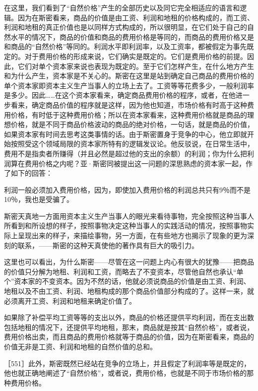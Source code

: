 在这里，我们看到了“自然价格”产生的全部历史以及同它完全相适应的语言和逻辑。因为在斯密看来，商品的价值是由工资、利润和地租的价格构成的，而工资、利润和地租的真正价值也是以同样方式构成的，所以很明显，在它们处于自己的自然水平的情况下，商品的价值和商品的费用价格是等同的，而商品的费用价格又是和商品的“自然价格”等同的。利润水平即利润率，以及工资率，都被假定为事先既定的。对于费用价格的形成来说，它们确实是既定的。它们是费用价格的前提。因此，它们对单个资本家来说也表现为既定的。至于它们怎样产生，在什么地方产生和为什么产生，资本家是不关心的。斯密在这里是站到确定自己商品的费用价格的单个资本家即资本主义生产当事人的立场上去了。工资等等花费多少，一般利润率是多少。因此……在这个资本家看来，确定商品费用价格的程序，或者，在他进一步看来，确定商品价值的程序就是这样，因为他也知道，市场价格有时高于这种费用价格，有时低于这种费用价格；所以在资本家看来，这种费用价格就是商品的理想价格，就是不同于商品价格波动的商品的绝对价格，一句话，就是商品的价值，如果资本家有时间去思考这类事情的话。由于斯密置身于竞争的中心，他立即就开始按照受这个领域局限的资本家所特有的逻辑发议论。他反驳说，在日常生活中，费用不是指卖者所赚得（并且必然是超过他的支出的余额）的利润；你为什么把利润算在费用价格之内呢？亚·斯密同被提出这一问题的深思熟虑的资本家一起，作了如下的回答：

利润一般必须加入费用价格，因为，即使加入费用价格的利润总共只有9％而不是10％，我也是受骗了。

斯密天真地一方面用资本主义生产当事人的眼光来看待事物，完全按照这种当事人所看到和所设想的样子，按照事物决定这种当事人的实践活动的情况，按照事物实际上呈现出来的样子，来描绘事物，另一方面，在有些地方也揭示了现象的更为深刻的联系，——斯密的这种天真使他的著作具有巨大的吸引力。

这里也可以看出，为什么斯密——尽管在这一问题上内心有很大的犹豫——把商品的价值只分解为地租、利润和工资，而略去了不变资本，尽管他自然也承认“单个”资本家的不变资本。因为不然的话，他就必须说商品的价值是由工资、利润、地租以及不由工资、利润、地租构成的那个商品价值部分构成的了。这样一来，就必须离开工资、利润和地租来确定价值了。

如果除了补偿平均工资等等的支出以外，商品的价格还提供平均利润，而在支出数包括地租的情况下，还提供平均地租，那末，商品就是按其“自然价格”，或者说，费用价格出卖，而且商品的费用价格就等于商品的价值，因为在斯密看来，商品的价值无非是工资、利润和地租的自然价值的总和。

［551］此外，斯密既然已经站在竞争的立场上，并且假定了利润率等是既定的，他也就正确地阐述了“自然价格”，或者说，费用价格，也就是不同于市场价格的那种费用价格。

